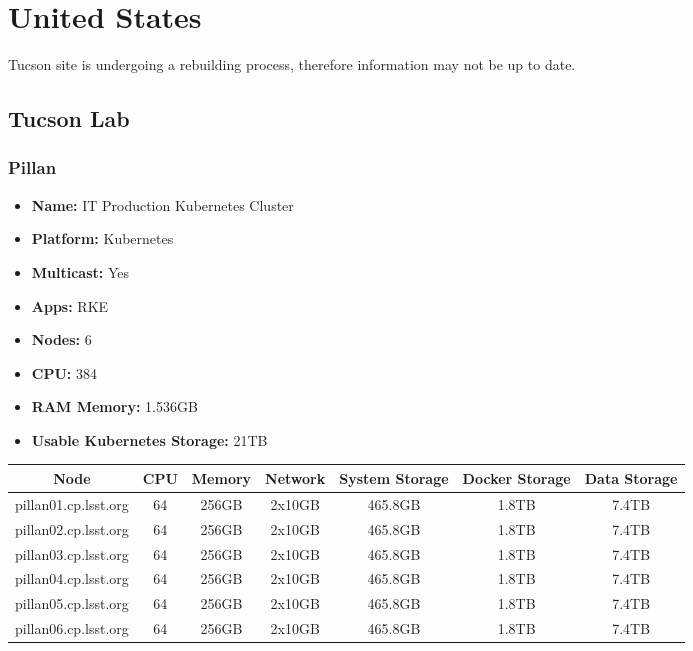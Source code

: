 \newpage
\section{United States}
\vspace*{-\baselineskip}
Tucson site is undergoing a rebuilding process, therefore information may not be up to date.
\subsection{Tucson Lab}
\subsubsection{Pillan}
\begin{itemize}
  \itemsep0em 
  \item \textbf{Name:}       IT Production Kubernetes Cluster
  \item \textbf{Platform:}   Kubernetes
  \item \textbf{Multicast:}  Yes
  \item \textbf{Apps:}       RKE
  \item \textbf{Nodes:}      6
  \item \textbf{CPU:}        384
  \item \textbf{RAM Memory:} 1.536GB
  \item \textbf{Usable Kubernetes Storage:} 21TB
\end{itemize}
\begin{center}
  \small
  \begin{tabular}{||c c c c c c c||} 
    \hline
    \textbf{Node} & \textbf{CPU} & \textbf{Memory} & \textbf{Network} & \textbf{System Storage} & \textbf{Docker Storage} & \textbf{Data Storage} \\ [0.5ex]
    \hline
    pillan01.cp.lsst.org & 64 & 256GB & 2x10GB & 465.8GB & 1.8TB & 7.4TB \\
    \hline
    pillan02.cp.lsst.org & 64 & 256GB & 2x10GB & 465.8GB & 1.8TB & 7.4TB \\
    \hline
    pillan03.cp.lsst.org & 64 & 256GB & 2x10GB & 465.8GB & 1.8TB & 7.4TB \\
    \hline
    pillan04.cp.lsst.org & 64 & 256GB & 2x10GB & 465.8GB & 1.8TB & 7.4TB \\
    \hline
    pillan05.cp.lsst.org & 64 & 256GB & 2x10GB & 465.8GB & 1.8TB & 7.4TB \\
    \hline
    pillan06.cp.lsst.org & 64 & 256GB & 2x10GB & 465.8GB & 1.8TB & 7.4TB \\
    \hline
  \end{tabular}
\end{center}

